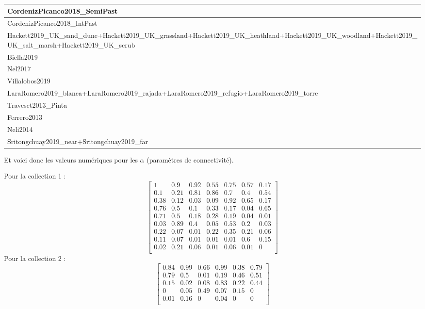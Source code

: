 \documentclass[
]{article}
\begin{document}
\begin{tabular}{l}
\hline
CordenizPicanco2018\_SemiPast\\
\hline
CordenizPicanco2018\_IntPast\\
\hline
Hackett2019\_UK\_sand\_dune+Hackett2019\_UK\_grassland+Hackett2019\_UK\_heathland+Hackett2019\_UK\_woodland+Hackett2019\_UK\_salt\_marsh+Hackett2019\_UK\_scrub\\
\hline
Biella2019\\
\hline
Nel2017\\
\hline
Villalobos2019\\
\hline
LaraRomero2019\_blanca+LaraRomero2019\_rajada+LaraRomero2019\_refugio+LaraRomero2019\_torre\\
\hline
Traveset2013\_Pinta\\
\hline
Ferrero2013\\
\hline
Neli2014\\
\hline
Sritongchuay2019\_near+Sritongchuay2019\_far\\
\hline
\end{tabular}

Et voici donc les valeurs numériques pour les \(\alpha\) (paramètres de
connectivité).

Pour la collection 1 :
\[\begin{bmatrix} 1 &0.9 &0.92 &0.55 &0.75 &0.57 &0.17 \\0.1 &0.21 &0.81 &0.86 &0.7 &0.4 &0.54 \\0.38 &0.12 &0.03 &0.09 &0.92 &0.65 &0.17 \\0.76 &0.5 &0.1 &0.33 &0.17 &0.04 &0.65 \\0.71 &0.5 &0.18 &0.28 &0.19 &0.04 &0.01 \\0.03 &0.89 &0.4 &0.05 &0.53 &0.2 &0.03 \\0.22 &0.07 &0.01 &0.22 &0.35 &0.21 &0.06 \\0.11 &0.07 &0.01 &0.01 &0.01 &0.6 &0.15 \\0.02 &0.21 &0.06 &0.01 &0.06 &0.01 &0 \\ \end{bmatrix}\]
Pour la collection 2 :
\[\begin{bmatrix} 0.84 &0.99 &0.66 &0.99 &0.38 &0.79 \\0.79 &0.5 &0.01 &0.19 &0.46 &0.51 \\0.15 &0.02 &0.08 &0.83 &0.22 &0.44 \\0 &0.05 &0.49 &0.07 &0.15 &0 \\0.01 &0.16 &0 &0.04 &0 &0 \\ \end{bmatrix}\]
\end{document}
